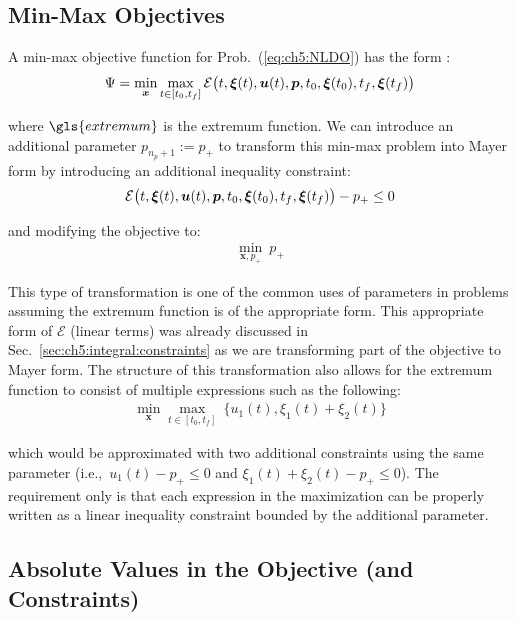 \subsection{Min-Max Objectives} \label{sec:ch5:minmax:objective}

A min-max objective function for Prob.~(\ref{eq:ch5:NLDO}) has the form \cite{Stryk1999a}:
\begin{align}
\Psi = \min_{\bm{x}} \max_{t\in[t_0,t_f]} \mathcal{E}\big(t, \bm{\xi}(t), \bm{u}(t), \bm{p}, t_0, \bm{\xi}(t_0), t_f, \bm{\xi}(t_f) \big)
\end{align}

\noindent where $\gls{extremum}$ is the extremum function.
We can introduce an additional parameter $p_{n_p+1} := p_+$ to transform this min-max problem into Mayer form by introducing an additional inequality constraint:
\begin{align}
\mathcal{E}\big(t, \bm{\xi}(t), \bm{u}(t), \bm{p}, t_0, \bm{\xi}(t_0), t_f, \bm{\xi}(t_f) \big) - p_+ \leq 0
\end{align}

\noindent and modifying the objective to:
\begin{align}
\min_{\bm{x}, p_+}\ p_+
\end{align}

This type of transformation is one of the common uses of parameters in \lqdo{} problems assuming the extremum function is of the appropriate form.
This appropriate form of $\mathcal{E}$ (linear terms) was already discussed in Sec.~\ref{sec:ch5:integral:constraints} as we are transforming part of the objective to Mayer form.
The structure of this transformation also allows for the extremum function to consist of multiple expressions such as the following:
\begin{align}
\min_{\bm{x}} \max_{t\in[t_0,t_f]}\ \{ u_1(t), \xi_1(t) + \xi_2(t) \}
\end{align}

\noindent which would be approximated with two additional constraints using the same parameter (i.e.,~$u_1(t) - p_+ \leq 0$ and $\xi_1(t) + \xi_2(t) - p_+ \leq 0$).
The requirement only is that each expression in the maximization can be properly written as a linear inequality constraint bounded by the additional parameter.

\subsection{Absolute Values in the Objective (and Constraints)} \label{sec:ch5:absolute:values}


